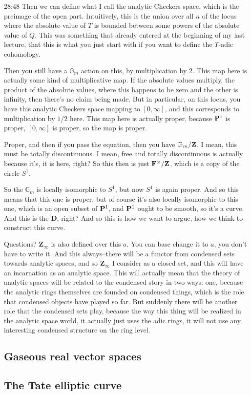 \begin{unfinished}{28:48}
Then we can define what I call the analytic Checkers space, which is the preimage of the open part. Intuitively, this is the union over all $n$ of the locus where the absolute value of $T$ is bounded between some powers of the absolute value of $Q$. This was something that already entered at the beginning of my last lecture, that this is what you just start with if you want to define the $T$-adic cohomology.

Then you still have a $\mathbb{G}_m$ action on this, by multiplication by 2. This map here is actually some kind of multiplicative map. If the absolute values multiply, the product of the absolute values, where this happens to be zero and the other is infinity, then there's no claim being made. But in particular, on this locus, you have this analytic Checkers space mapping to $[0,\infty]$, and this corresponds to multiplication by $1/2$ here. This map here is actually proper, because $\P^1$ is proper, $[0,\infty]$ is proper, so the map is proper.

Proper, and then if you pass the equation, then you have $\mathbb{G}_m / \Z$. I mean, this must be totally discontinuous. I mean, free and totally discontinuous is actually because it's, it is here, right? So this then is just $\F^\times / \Z$, which is a copy of the circle $S^1$. 

So the $\mathbb{G}_m$ is locally isomorphic to $S^1$, but now $S^1$ is again proper. And so this means that this one is proper, but of course it's also locally isomorphic to this one, which is an open subset of $\P^1$, and $\P^1$ ought to be smooth, so it's a curve. And this is the $\mathbf{D}$, right? And so this is how we want to argue, how we think to construct this curve.

Questions? $\mathbf{Z}_\infty$ is also defined over this $a$. You can base change it to $a$, you don't have to write it. And this always--there will be a functor from condensed sets towards analytic spaces, and so $\mathbf{Z}_\infty$ I consider as a closed set, and this will have an incarnation as an analytic space. This will actually mean that the theory of analytic spaces will be related to the condensed story in two ways: one, because the analytic rings themselves are founded on condensed things, which is the role that condensed objects have played so far. But suddenly there will be another role that the condensed sets play, because the way this thing will be realized in the analytic space world, it actually just uses the adic rings, it will not use any interesting condensed structure on the ring level.

\end{unfinished}
\subsection{\ufs Gaseous real vector spaces}
\subsection{\ufs The Tate elliptic curve}